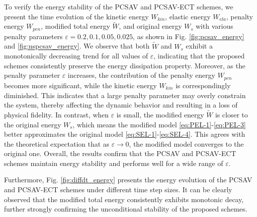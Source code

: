 \documentclass[12pt,reqno]{amsart}
\numberwithin{equation}{section}
\begin{document}
To verify the energy stability of the PCSAV and PCSAV-ECT schemes, we present the time evolution of the kinetic energy $W_{kin}$, elastic energy $W_{ela}$, penalty energy $W_{pen}$, modified total energy $\tilde{W}$, and original energy $W_s$ with various penalty parameters $\varepsilon=0.2, 0.1, 0.05, 0.025$, as shown in Fig. \ref{fig:pcsav_energy} and \ref{fig:nspcsav_energy}.
We observe that both $\tilde{W}$ and $W_s$ exhibit a monotonically decreasing trend for all values of $\varepsilon$, indicating that the proposed schemes consistently preserve the energy dissipation property.
Moreover, as the penalty parameter $\varepsilon$ increases, the contribution of the penalty energy $W_{pen}$ becomes more significant, while the kinetic energy $W_{kin}$ is correspondingly diminished. 
This indicates that a large penalty parameter may overly constrain the system, thereby affecting the dynamic behavior and resulting in a loss of physical fidelity.
In contrast, when $\varepsilon$ is small, the modified energy $\tilde{W}$ is closer to the original energy $W_s$, which means the modified model \eqref{eq:PEL-1}-\eqref{eq:PEL-3} better approximates the original model \eqref{eq:SEL-1}-\eqref{eq:SEL-4}. This agrees with the theoretical expectation that as $\varepsilon\to0$, the modified model converges to the original one.
Overall, the results confirm that the PCSAV and PCSAV-ECT schemes maintain energy stability and performs well for a wide range of $\varepsilon$.

Furthermore, Fig. \ref{fig:diffdt_energy} presents the energy evolution of the PCSAV and PCSAV-ECT schemes under different time step sizes. It can be clearly observed that the modified total energy consistently exhibits monotonic decay, further strongly confirming the unconditional stability of the proposed schemes.
\end{document}

